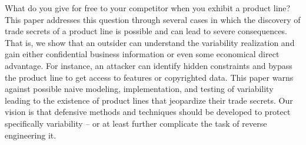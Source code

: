 What do you give for free to your competitor when you exhibit a product line? 
This paper addresses this question through several cases in which the discovery of trade secrets of a product line is possible and can lead to severe consequences. 
That is, we show that an outsider can understand the variability realization and gain either confidential business information or even some economical direct advantage.  
For instance, an attacker can identify hidden constraints and bypass the product line to get access to features or copyrighted data.
This paper warns against possible naive modeling, implementation, and testing of variability leading to the existence of 
product lines that jeopardize their trade secrets.
 Our vision is that defensive methods and techniques should be developed to protect specifically variability -- or at least further complicate the task of reverse engineering it.

  



 




